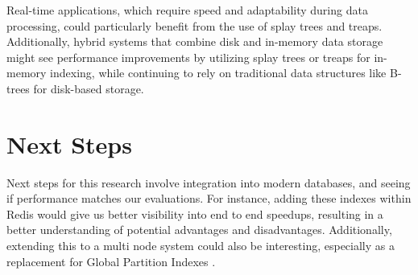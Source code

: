 \documentclass[sigconf]{acmart}
\begin{document}
Real-time applications, which require speed and adaptability during data processing, could particularly benefit from the use of splay trees and treaps. Additionally, hybrid systems that combine disk and in-memory data storage might see performance improvements by utilizing splay trees or treaps for in-memory indexing, while continuing to rely on traditional data structures like B-trees for disk-based storage.

\section{Next Steps}
Next steps for this research involve integration into modern databases, and seeing if performance matches our evaluations. For instance, adding these indexes within Redis would give us better visibility into end to end speedups, resulting in a better understanding of potential advantages and disadvantages. Additionally, extending this to a multi node system could also be interesting, especially as a replacement for Global Partition Indexes \cite{gpi}.

\clearpage



\end{document}
